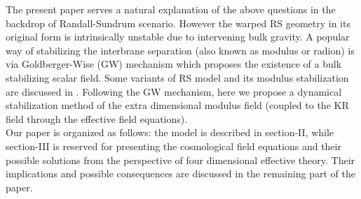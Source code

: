 \documentclass[a4paper]{article}
\begin{document}
The present paper serves a natural explanation of the above questions in the backdrop of Randall-Sundrum scenario. However the warped 
RS geometry in its original form is intrinsically unstable due to intervening bulk gravity. 
A popular way of stabilizing the interbrane separation (also known as modulus or radion) is via Goldberger-Wise (GW) 
mechanism \cite{GW,GW_radion} which proposes the existence of a bulk stabilizing scalar field. 
Some variants of RS model and its modulus stabilization are discussed in \cite{csaki,julien,wolfe,tp_generalized,tp_backreaction,tp_F(R),tp_bouncing,
tp_tunneling}. Following the GW mechanism, here we propose a 
dynamical stabilization method of the extra dimensional modulus field (coupled to the KR field through the effective field equations).\\
Our paper is organized as follows: the model is described in section-II, while section-III is reserved for presenting the cosmological field 
equations and their possible solutions from the perspective of four dimensional effective theory. Their implications and possible consequences 
are discussed in the remaining part of the paper.
\end{document}
